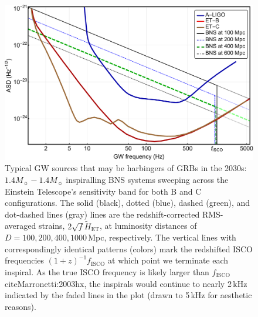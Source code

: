 \documentclass{aa}
\begin{document}
\newpage

\begin{figure}[h]
\includegraphics[width=\linewidth]{../Figs/ET_strains_redshifted.pdf}
\caption{Typical GW sources that may be harbingers of GRBs in the 2030s: $1.4 M_\sun-1.4 M_\sun$ inspiralling BNS systems sweeping across 
the Einstein Telescope's sensitivity band for both B and C configurations.
The solid (black), dotted (blue), dashed (green), and dot-dashed lines (gray) lines are the redshift-corrected
RMS-averaged strains, $2\sqrt{f}\tilde{H}_\text{ET}$, at luminosity distances of $D=100, 200, 400, 1000\,$Mpc, respectively. 
The vertical lines with correspondingly identical patterns (colors) mark the redshifted ISCO frequencies $(1+z)^{-1} f_\text{ISCO}$ at which point we terminate each inspiral.
As the true ISCO frequency is likely larger than $f_\text{ISCO}$ cite{Marronetti:2003hx}, the inspirals would continue to nearly 2\,kHz indicated by the 
faded lines in the plot (drawn to 5\,kHz for aesthetic reasons).
}
\label{fig:ETB2030}
\end{figure}
\end{document}
